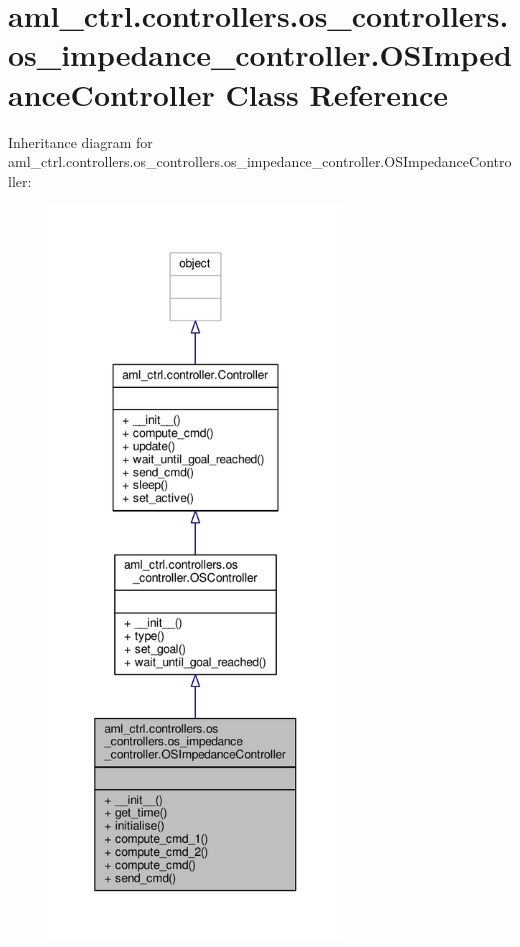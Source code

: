 \hypertarget{classaml__ctrl_1_1controllers_1_1os__controllers_1_1os__impedance__controller_1_1_o_s_impedance_controller}{\section{aml\-\_\-ctrl.\-controllers.\-os\-\_\-controllers.\-os\-\_\-impedance\-\_\-controller.\-O\-S\-Impedance\-Controller Class Reference}
\label{classaml__ctrl_1_1controllers_1_1os__controllers_1_1os__impedance__controller_1_1_o_s_impedance_controller}
}


Inheritance diagram for aml\-\_\-ctrl.\-controllers.\-os\-\_\-controllers.\-os\-\_\-impedance\-\_\-controller.\-O\-S\-Impedance\-Controller\-:
\nopagebreak
\begin{figure}[H]
\begin{center}
\leavevmode
\includegraphics[height=550pt]{classaml__ctrl_1_1controllers_1_1os__controllers_1_1os__impedance__controller_1_1_o_s_impedance_controller__inherit__graph}
\end{center}
\end{figure}


